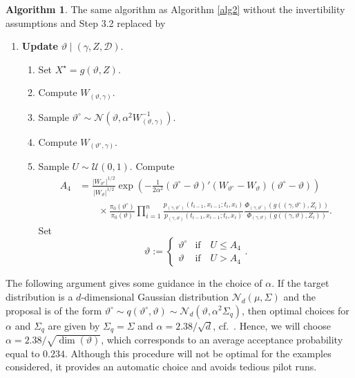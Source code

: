 \documentclass[preprint]{imsart}
\newcommand{\ga}{\gamma}
\newcommand{\scr}[1]{{\mathcal #1}}
\theoremstyle{definition}
\newtheorem{algorithm}{Algorithm}
\begin{document}
\begin{algorithm}\label{alg3} The same algorithm as Algorithm \ref{alg2} without the invertibility assumptions and Step 3.2 replaced by
\begin{enumerate}
\item[3.2'] {\bf Update } $\vartheta \mid (\gamma,  Z , \scr{D})$. 
\begin{enumerate}
\item Set $X^\star=  g(\vartheta, Z)$.
\item Compute $W_{(\vartheta,\ga)}$.
\item Sample ${\vartheta^\circ} \sim \scr N(\vartheta, \alpha^2 W_{(\vartheta,\ga)}^{-1})$.
\item Compute $W_{({\vartheta^\circ},\ga)}$.
\item   Sample $U \sim \scr{U}(0,1)$. Compute
\begin{align*}	 A_4 &=   \frac{|W_{{\vartheta^\circ}}|^{1/2}}{|W_{\vartheta}|^{1/2}}  \exp\left(- \frac{1}{2\alpha^2}  ({\vartheta^\circ}-\vartheta)'  (W_{\vartheta^\circ}-W_{\vartheta})  ({\vartheta^\circ}-\vartheta)\right)\\ & \qquad \times \frac{\pi_0({\vartheta^\circ})}{\pi_0(\vartheta)}\prod_{i=1}^n \frac{p_{(\ga,{\vartheta^\circ})}(t_{i-1},x_{i-1}; t_i, x_i)}{p_{(\ga,\vartheta)}(t_{i-1},x_{i-1}; t_i, x_i)}
\frac{\Phi_{(\ga,{\vartheta^\circ})}(g((\ga,{\vartheta^\circ}), Z_i))}{\Phi_{ (\ga,\vartheta)}(g((\ga,\vartheta),Z_i))} .\end{align*}
Set 
\[\vartheta := \begin{cases} {\vartheta^\circ} & \text{if}\quad U\le A_4 \\
 \vartheta & \text{if}\quad U> A_4 \end{cases}. \]
\end{enumerate}
\end{enumerate}
\end{algorithm}



The following argument gives some guidance in the choice of $\alpha$. If the target distribution is a $d$-dimensional Gaussian distribution $\scr N_d(\mu, \Sigma)$ and the proposal is of the form ${\vartheta^\circ} \sim q({\vartheta^\circ},\vartheta) \sim \scr N_d (\vartheta , \alpha^2\Sigma_q)$, then optimal choices for $\alpha$ and $\Sigma_q$ are given by  $\Sigma_q = \Sigma$ and $\alpha = 2.38/\sqrt d$, cf.\ \cite{RosenthalChapter}. Hence, we will choose $\alpha=2.38/\sqrt{\dim(\vartheta)}$, which corresponds to an average acceptance probability equal to $0.234$.  Although this procedure will not be optimal for the examples considered, it provides an automatic choice and avoids tedious pilot runs.
\end{document}
